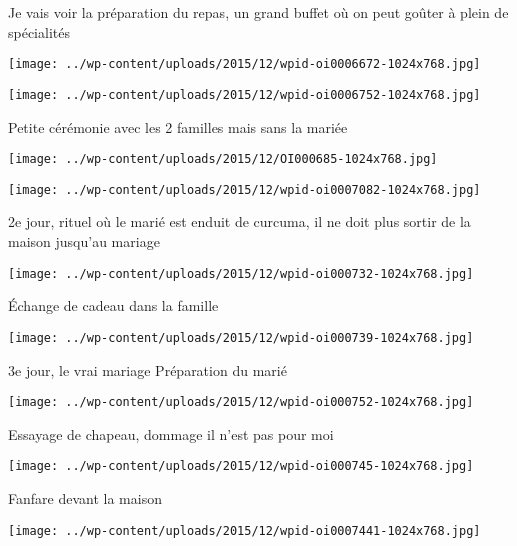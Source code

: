  Je vais voir la préparation du repas, un grand buffet où on peut goûter à plein de spécialités \newline
 \newline
\centerline{\texttt{[image: ../wp-content/uploads/2015/12/wpid-oi0006672-1024x768.jpg]} } 
 \newline
 \newline
\centerline{\texttt{[image: ../wp-content/uploads/2015/12/wpid-oi0006752-1024x768.jpg]} } 
 \newline
 Petite cérémonie avec les 2 familles mais sans la mariée \newline
 \newline
\centerline{\texttt{[image: ../wp-content/uploads/2015/12/OI000685-1024x768.jpg]} } 
 \newline
 \newline
\centerline{\texttt{[image: ../wp-content/uploads/2015/12/wpid-oi0007082-1024x768.jpg]} } 
 \newline
 2e jour, rituel où le marié est enduit de curcuma, il ne doit plus sortir de la maison jusqu'au mariage \newline
 \newline
\centerline{\texttt{[image: ../wp-content/uploads/2015/12/wpid-oi000732-1024x768.jpg]} } 
 \newline
 Échange de cadeau dans la famille \newline
 \newline
\centerline{\texttt{[image: ../wp-content/uploads/2015/12/wpid-oi000739-1024x768.jpg]} } 
 \newline
 3e jour, le vrai mariage \newline
 Préparation du marié \newline
 \newline
\centerline{\texttt{[image: ../wp-content/uploads/2015/12/wpid-oi000752-1024x768.jpg]} } 
 \newline
 Essayage de chapeau, dommage il n'est pas pour moi \newline
 \newline
\centerline{\texttt{[image: ../wp-content/uploads/2015/12/wpid-oi000745-1024x768.jpg]} } 
 \newline
 Fanfare devant la maison \newline
 \newline
\centerline{\texttt{[image: ../wp-content/uploads/2015/12/wpid-oi0007441-1024x768.jpg]} } 
